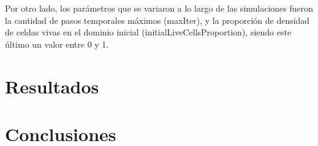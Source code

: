 \documentclass[11pt]{article}
\begin{document}
    Por otro lado, los parámetros que se variaron a lo largo de las simulaciones fueron la cantidad de pasos temporales
    máximos (maxIter), y la proporción de densidad de celdas vivas en el dominio inicial (initialLiveCellsProportion),
    siendo este último un valor entre 0 y 1.


    \section{Resultados}\label{sec:resultados}


    \section{Conclusiones}\label{sec:conclusiones}
\end{document}
